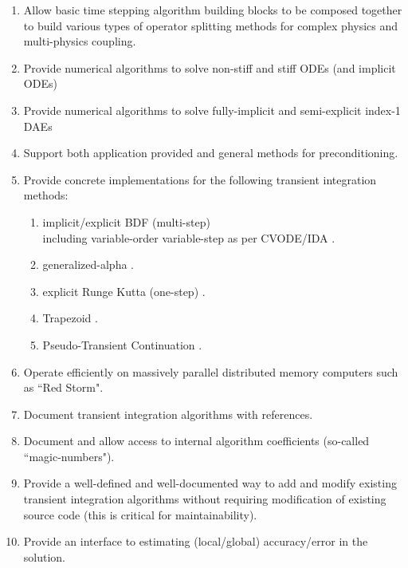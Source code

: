 \documentclass[pdf,ps2pdf,11pt]{SANDreport}
\begin{document}
\begin{enumerate}
{}\item Allow basic time stepping algorithm building blocks to be composed
together to build various types of operator splitting methods for complex
physics and multi-physics coupling.

{}\item Provide numerical algorithms to solve non-stiff and stiff ODEs (and
implicit ODEs)

{}\item Provide numerical algorithms to solve fully-implicit and semi-explicit
index-1 DAEs

{}\item Support both application provided and general methods for
preconditioning.

{}\item Provide concrete implementations for the following transient integration methods:
  \begin{enumerate}
  {}\item implicit/explicit BDF (multi-step) \\
        including variable-order variable-step as per CVODE/IDA \cite{CVODE,IDA}.
  {}\item generalized-alpha \cite{ChungHulbert}.
  {}\item explicit Runge Kutta (one-step) \cite{ERKMethods}.
  {}\item Trapezoid \cite{Trapezoid}.
  {}\item Pseudo-Transient Continuation \cite{PTC,PTCDAE}.
  \end{enumerate}

{}\item Operate efficiently on massively parallel distributed memory
computers such as ``Red Storm".

{}\item Document transient integration algorithms with references.

{}\item Document and allow access to internal algorithm coefficients
(so-called ``magic-numbers").

{}\item Provide a well-defined and well-documented way to add and modify
existing transient integration algorithms without requiring modification of
existing source code (this is critical for maintainability).

{}\item Provide an interface to estimating (local/global)
accuracy/error in the solution.


\end{enumerate}
\end{document}
